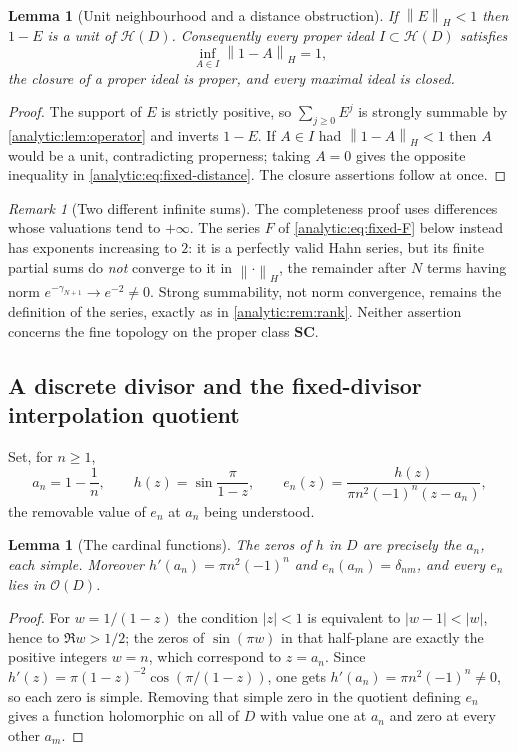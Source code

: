 \documentclass[11pt,letterpaper]{article}
\newtheorem{lemma}[theorem]{Lemma}
\theoremstyle{definition}
\theoremstyle{remark}
\newtheorem{remark}[theorem]{Remark}
\newcommand{\SC}{\mathbf{SC}}
\newcommand{\HH}{\mathcal H}
\newcommand{\OO}{\mathcal O}
\newcommand{\norm}[1]{\left\lVert#1\right\rVert}
\numberwithin{equation}{section}
\begin{document}
\begin{lemma}[Unit neighbourhood and a distance obstruction]
\label{analytic:lem:fixed-distance}
If $\norm{E}_H<1$ then $1-E$ is a unit of $\HH(D)$. Consequently every
proper ideal $I\subset\HH(D)$ satisfies
\begin{equation}\label{analytic:eq:fixed-distance}
 \inf_{A\in I}\norm{1-A}_H=1 ,
\end{equation}
the closure of a proper ideal is proper, and every maximal ideal is closed.
\end{lemma}
\begin{proof}
The support of $E$ is strictly positive, so $\sum_{j\ge0}E^j$ is strongly
summable by \cref{analytic:lem:operator} and inverts $1-E$. If $A\in I$ had
$\norm{1-A}_H<1$ then $A$ would be a unit, contradicting properness; taking
$A=0$ gives the opposite inequality in \eqref{analytic:eq:fixed-distance}.
The closure assertions follow at once.
\end{proof}

\begin{remark}[Two different infinite sums]\label{analytic:rem:fixed-two-sums}
The completeness proof uses differences whose valuations tend to
$+\infty$. The series $F$ of \eqref{analytic:eq:fixed-F} below instead has
exponents increasing to $2$: it is a perfectly valid Hahn series, but its
finite partial sums do \emph{not} converge to it in $\norm{\cdot}_H$, the
remainder after $N$ terms having norm $e^{-\gamma_{N+1}}\to e^{-2}\ne0$.
Strong summability, not norm convergence, remains the definition of the
series, exactly as in \cref{analytic:rem:rank}. Neither assertion concerns
the fine topology on the proper class $\SC$.
\end{remark}

\subsection{A discrete divisor and the fixed-divisor interpolation quotient}
\label{analytic:subsec:fixed-divisor}
Set, for $n\ge1$,
\begin{equation}\label{analytic:eq:fixed-cardinal-data}
 a_n=1-\frac1n,\qquad h(z)=\sin\frac{\pi}{1-z},\qquad
 e_n(z)=\frac{h(z)}{\pi n^2(-1)^n(z-a_n)},
\end{equation}
the removable value of $e_n$ at $a_n$ being understood.

\begin{lemma}[The cardinal functions]\label{analytic:lem:fixed-cardinal}
The zeros of $h$ in $D$ are precisely the $a_n$, each simple. Moreover
$h'(a_n)=\pi n^2(-1)^n$ and $e_n(a_m)=\delta_{nm}$, and every $e_n$ lies in
$\OO(D)$.
\end{lemma}
\begin{proof}
For $w=1/(1-z)$ the condition $|z|<1$ is equivalent to $|w-1|<|w|$, hence
to $\Re w>1/2$; the zeros of $\sin(\pi w)$ in that half-plane are exactly
the positive integers $w=n$, which correspond to $z=a_n$. Since
$h'(z)=\pi(1-z)^{-2}\cos(\pi/(1-z))$, one gets $h'(a_n)=\pi n^2(-1)^n\ne0$,
so each zero is simple. Removing that simple zero in the quotient defining
$e_n$ gives a function holomorphic on all of $D$ with value one at $a_n$
and zero at every other $a_m$.
\end{proof}
\end{document}

